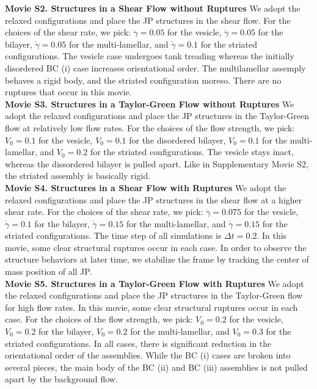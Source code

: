 \noindent
{\bf Movie S2. Structures in a Shear Flow without Ruptures} 
We adopt the relaxed configurations and place the JP structures in the shear flow. 
For the choices of the shear rate, we pick: $\dot\gamma = 0.05$ for the vesicle, $\dot\gamma = 0.05$ for the bilayer, 
$\dot\gamma = 0.05$ for the multi-lamellar, and $\dot\gamma = 0.1$ for the striated configurations.
The vesicle case undergoes tank treading
whereas the initially disordered BC (i) case
increases orientational order.  The multilamellar
assemply behaves a rigid body,
and the striated configuration moreso.
There are no ruptures that occur in this movie.\\



\noindent
{\bf Movie S3. Structures in a Taylor-Green Flow without Ruptures} 
We adopt the relaxed configurations and place the JP structures in the Taylor-Green flow
at relatively low flow rates.
For the choices of the flow strength, we pick: $V_0 = 0.1$ for the vesicle, $V_0 = 0.1$ for the
disordered bilayer, 
$V_0 = 0.1$ for the multi-lamellar, and $V_0 = 0.2$ for the striated configurations.
The vesicle stays inact, whereas the dissordered bilayer is pulled apart.
Like in Supplementary Movie S2, the striated assembly is basically rigid.\\


\noindent
{\bf Movie S4. Structures in a Shear Flow with Ruptures} 
We adopt the relaxed configurations and place the JP structures in the shear flow
at a higher shear rate. 
For the choices of the shear rate, we pick: $\dot\gamma = 0.075$ for the
vesicle, $\dot\gamma = 0.1$ for the bilayer, 
$\dot\gamma = 0.15$ for the multi-lamellar, and $\dot\gamma = 0.15$ for the striated configurations.
The time step of all simulations is $\Delta t=0.2$.
In this movie, some clear structural ruptures occur in each case.
In order to observe the structure behaviors at later time,
we stabilize the frame by tracking the center of mass position of all JP. \\


\noindent
{\bf Movie S5. Structures in a Taylor-Green Flow with Ruptures} 
We adopt the relaxed configurations and place the JP structures in the Taylor-Green flow
for high flow rates. 
In this movie, some clear structural ruptures occur in each case.
For the choices of the flow strength, we pick: $V_0 = 0.2$ for the vesicle, $V_0 = 0.2$ for the bilayer, 
$V_0 = 0.2$ for the multi-lamellar, and $V_0 = 0.3$ for the striated configurations.
In all cases, there is significant reduction in the orientational order of the assemblies.
While the BC (i) cases are broken into several pieces, the main body of the
BC (ii) and BC (iii) assemblies is not pulled apart by the background flow. 
\\

